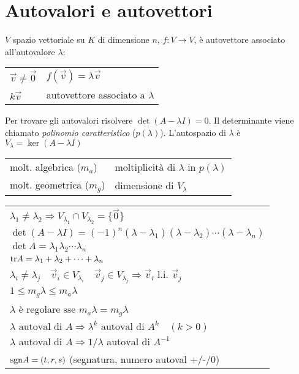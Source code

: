 \section{Autovalori e autovettori}

$V$ spazio vettoriale su $K$ di dimensione $n$, $f: V \rightarrow V$,  è autovettore associato all'autovalore $\lambda$:
\begin{tabular}{ll}
	$\vec{v} \ne \vec{0}$ & $f(\vec{v}) = \lambda \vec{v}$ \\
	$k\vec{v}$ & autovettore associato a $\lambda$
\end{tabular}

Per trovare gli autovalori risolvere $\det(A-\lambda I) = 0$. Il determinante viene chiamato \emph{polinomio caratteristico} ($p(\lambda)$).
L'autospazio di $\lambda$ è $V_\lambda = \ker(A-\lambda I)$

\begin{tabular}{ll}
	molt. algebrica ($m_a$) & moltiplicità di $\lambda$ in $p(\lambda)$ \\
	molt. geometrica ($m_g$) & dimensione di $V_\lambda$
\end{tabular}

\begin{tabular}{l}
	$\lambda_1 \ne \lambda_2 \Rightarrow V_{\lambda_1} \cap V_{\lambda_2} = \{\vec{0}\}$ \\
	$\det(A-\lambda I) = (-1)^n (\lambda - \lambda_1) (\lambda - \lambda_2) \cdots (\lambda - \lambda_n)$ \\
	$\det A = \lambda_1 \lambda_2 \cdots \lambda_n$ \\
	$\mathrm{tr} A = \lambda_1 + \lambda_2 + \cdots + \lambda_n$ \\
	$\lambda_i \ne \lambda_j \quad \vec{v}_i \in V_{\lambda_i} \quad \vec{v}_j \in V_{\lambda_j} \Rightarrow \vec{v}_i$ l.i. $\vec{v}_j$ \\
	$1 \le m_g \lambda \le m_a \lambda$ \\
	$\lambda$ è regolare sse $m_a \lambda = m_g \lambda$ \\
	$\lambda \text{ autoval di } A \Rightarrow \lambda^k \text{ autoval di } A^k \quad (k > 0)$ \\
	$\lambda \text{ autoval di } A \Rightarrow 1/\lambda \text{ autoval di } A^{-1}$ \\
	$\mathrm{sgn} A = (t,r,s)$ (segnatura, numero autoval +/-/0)
\end{tabular}